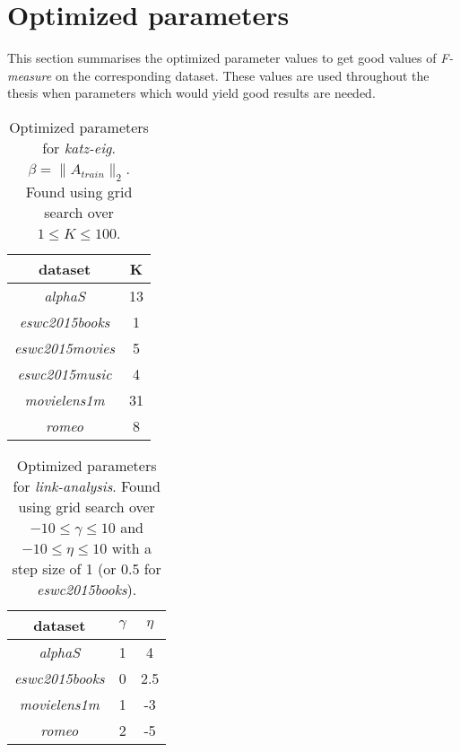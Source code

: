 
\section{Optimized parameters}\label{sec:opt_params}

This section summarises the optimized parameter values to get good values of \textit{F-measure} on the corresponding dataset. These values are used throughout the thesis when parameters which would yield good results are needed.


\begin{table}[h!]
    \centering
    \begin{tabular}{| c | c |}
        \hline
        \textbf{dataset}                & K \\ \hline
        \textit{alphaS}         & 13 \\ \hline
        \textit{eswc2015books}  & 1 \\ \hline
        \textit{eswc2015movies} & 5 \\ \hline
        \textit{eswc2015music}  & 4 \\ \hline
        \textit{movielens1m}    & 31 \\ \hline
        \textit{romeo}          & 8 \\ \hline
    \end{tabular}
    \caption{Optimized parameters for \textit{katz-eig}. $\beta = \|A_{train}\|_2$. Found using grid search over $1 \leq K \leq 100$.}
    \label{tab:katzeig_params_used}
\end{table}

\begin{table}[h!]
    \centering
    \begin{tabular}{| c | c | c |}
        \hline
        \textbf{dataset} & \textbf{$\gamma$} & \textbf{$\eta$} \\ \hline
        \textit{alphaS}         & 1    & 4 \\ \hline
        \textit{eswc2015books}  & 0    & 2.5 \\ \hline
        \textit{movielens1m}    & 1    & -3 \\ \hline
        \textit{romeo}          & 2    & -5 \\ \hline
    \end{tabular}
    \caption{Optimized parameters for \textit{link-analysis}. Found using grid search over $-10 \leq \gamma \leq 10$ and $-10 \leq \eta \leq 10$ with a step size of 1 (or 0.5 for \textit{eswc2015books}).}
    \label{tab:linkanalysis_params_used}
\end{table}

